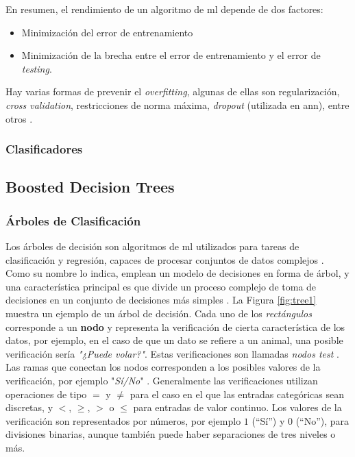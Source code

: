 En resumen, el rendimiento de un algoritmo de \acrshort{ml} depende de dos factores:
\begin{itemize}
    \item Minimización del error de entrenamiento
    \item Minimización de la brecha entre el error de entrenamiento y el error de \emph{testing}.
\end{itemize}

Hay varias formas de prevenir el \emph{overfitting}, algunas de ellas son regularización, \emph{cross validation}, restricciones de norma máxima, \emph{dropout} (utilizada en \acrshort{ann}), entre otros \cite{Buduma}.

\subsubsection{Clasificadores}


\subsection{Boosted Decision Trees}

\subsubsection{Árboles de Clasificación}

Los árboles de decisión son algoritmos de \acrshort{ml} utilizados para tareas de clasificación y regresión, capaces de procesar conjuntos de datos complejos \cite{Geron}.
%
Como su nombre lo indica, emplean un modelo de decisiones en forma de árbol, y una característica principal es que divide un proceso complejo de toma de decisiones en un conjunto de decisiones más simples \cite{Safavian}.
%
La Figura \ref{fig:tree1} muestra un ejemplo de un árbol de decisión. 
%
Cada uno de los \textit{rectángulos} corresponde a un \textbf{nodo} y representa la verificación de cierta característica de los datos, por ejemplo, en el caso de que un dato se refiere a un animal, una posible verificación sería \textit{"¿Puede volar?"}. Estas verificaciones son llamadas \textit{nodos test} \cite{Muller}. 
%
Las ramas que conectan los nodos corresponden a los posibles valores de la verificación, por ejemplo "\textit{Sí/No}" \cite{Mitchell}. Generalmente las verificaciones utilizan operaciones de tipo $=$ y $\neq$ para el caso en el que las entradas categóricas sean discretas, y $<$, $\ge$, $>$ o $\le$ para entradas de valor continuo. Los valores de la verificación son representados por números, por ejemplo $1$ (``Sí'') y $0$ (``No''), para divisiones binarias, aunque también puede haber separaciones de tres niveles o más.
%

